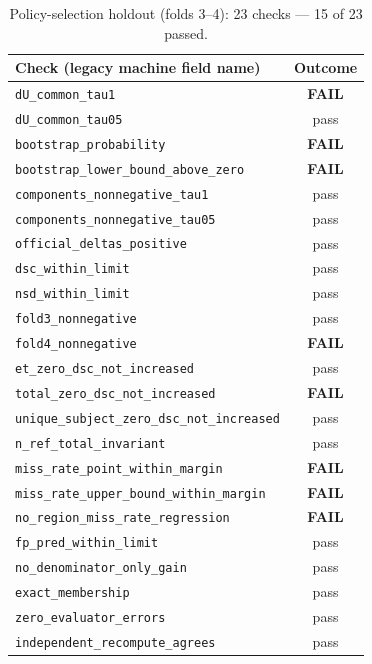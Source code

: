 \documentclass[runningheads]{llncs}
\begin{document}
\begin{table}[htbp]\centering
\caption{Policy-selection holdout (folds 3--4): 23 checks --- 15 of 23 passed.}
\begin{tabular}{@{}lc@{}}
\toprule
Check (legacy machine field name) & Outcome \\
\midrule
\texttt{dU\_common\_tau1} & \textbf{FAIL} \\
\texttt{dU\_common\_tau05} & pass \\
\texttt{bootstrap\_probability} & \textbf{FAIL} \\
\texttt{bootstrap\_lower\_bound\_above\_zero} & \textbf{FAIL} \\
\texttt{components\_nonnegative\_tau1} & pass \\
\texttt{components\_nonnegative\_tau05} & pass \\
\texttt{official\_deltas\_positive} & pass \\
\texttt{dsc\_within\_limit} & pass \\
\texttt{nsd\_within\_limit} & pass \\
\texttt{fold3\_nonnegative} & pass \\
\texttt{fold4\_nonnegative} & \textbf{FAIL} \\
\texttt{et\_zero\_dsc\_not\_increased} & pass \\
\texttt{total\_zero\_dsc\_not\_increased} & \textbf{FAIL} \\
\texttt{unique\_subject\_zero\_dsc\_not\_increased} & pass \\
\texttt{n\_ref\_total\_invariant} & pass \\
\texttt{miss\_rate\_point\_within\_margin} & \textbf{FAIL} \\
\texttt{miss\_rate\_upper\_bound\_within\_margin} & \textbf{FAIL} \\
\texttt{no\_region\_miss\_rate\_regression} & \textbf{FAIL} \\
\texttt{fp\_pred\_within\_limit} & pass \\
\texttt{no\_denominator\_only\_gain} & pass \\
\texttt{exact\_membership} & pass \\
\texttt{zero\_evaluator\_errors} & pass \\
\texttt{independent\_recompute\_agrees} & pass \\
\bottomrule
\end{tabular}
\end{table}
\end{document}
